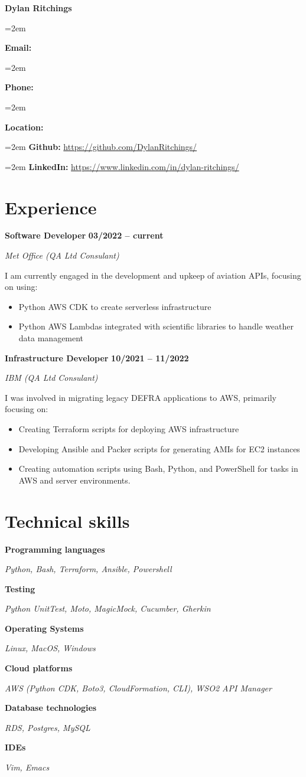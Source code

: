 \documentclass[12pt]{article}
\newlength{\spacebox}
\newcommand{\sepspace}{\vspace*{1em}}
\newcommand{\name}[1]{
\Huge 
\begin{center} \textbf{#1} \end{center}\par
\normalsize}
\newcommand{\info}[2]{
  \noindent\hangindent=2em\hangafter=0
  \parbox{\spacebox}{%
    \textbf{#1:}} #2 \par
  } %
\newcommand{\link}[2]{
  \noindent\hangindent=2em\hangafter=0
  \textbf{#1:} \url{#2} \par
  }
\newcommand{\skill}[2]{
\noindent\hangafter=0
\begin{minipage}[t]{0.31\textwidth}
  \textbf{#1} 
  \end{minipage}
  \hfill %
  \begin{minipage}[t]{0.6\textwidth}
      #2
  \end{minipage}
  \par
  \vspace*{0.5em}} %
\newcommand{\work}[4]{
  \noindent  \textbf{#1}
  \hfill 
  {%
  \centering\textbf{#2}} \par
  \noindent \textit{#3} \par
  \vspace*{0.3em}
  \noindent\hangafter=0 \small #4 
\normalsize \par}
\begin{document}
\name{Dylan Ritchings}
\vspace*{-10pt}

\sepspace
\info{Email}{}
\info{Phone}{}
\info{Location}{}

\sepspace
\link{Github}{https://github.com/DylanRitchings/}
\link{LinkedIn}{https://www.linkedin.com/in/dylan-ritchings/}

\section*{Experience}

\work{Software Developer}{03/2022 -- current}{Met Office (QA Ltd Consulant)}
{I am currently engaged in the development and upkeep of aviation APIs, focusing on using:

\begin{itemize}
    \item Python AWS CDK to create serverless infrastructure
    \item Python AWS Lambdas integrated with scientific libraries to handle weather data management
\end{itemize}}

\sepspace

\work{Infrastructure Developer}{10/2021 -- 11/2022}{IBM (QA Ltd Consulant)}
{I was involved in migrating legacy DEFRA applications to AWS, primarily focusing on:
\begin{itemize}
    \item Creating Terraform scripts for deploying AWS infrastructure
    \item Developing Ansible and Packer scripts for generating AMIs for EC2 instances
    \item Creating automation scripts using Bash, Python, and PowerShell for tasks in AWS and server environments.
\end{itemize}}

\section*{Technical skills}

\skill{Programming languages}{\textsl{Python, Bash, Terraform, Ansible, Powershell}}
\skill{Testing}{\textsl {Python UnitTest, Moto, MagicMock, Cucumber, Gherkin}}
\skill{Operating Systems}{\textsl{Linux, MacOS, Windows}}
\skill{Cloud platforms}{\textsl{AWS (Python CDK, Boto3, CloudFormation, CLI), WSO2 API Manager}}
\skill{Database technologies}{\textsl{RDS, Postgres, MySQL}}
\skill{IDEs}{\textsl{Vim, Emacs}}
\end{document}
